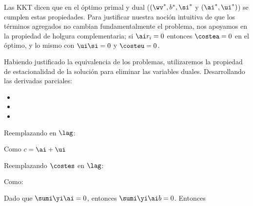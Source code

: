 Las KKT dicen que en el óptimo primal y dual ($(\wv^*,b^*,\si^*$ y $(\ai^*,\ui^*)$) se cumplen estas propiedades. Para justificar nuestra noción intuitiva de que los términos agregados no cambian fundamentalmente el problema, nos apoyamos en la propiedad de holgura complementaria; si $\ai r_i=0$ entonces $\costea =0$ en el óptimo, y lo mismo con $\ui \si = 0$ y $\costeu =0$.

Habiendo justificado la equivalencia de los problemas, utilizaremos la propiedad de estacionalidad de la solución para eliminar las variables duales. Desarrollando las derivadas parciales:
\begin{itemize}
\item {}
\item {}

\item {} 

\end{itemize}


Reemplazando en $\lag$:

\ma{
\lag = \costew + \costes - \costea - \costeu
}

Como $c = \ai+\ui$


Reemplazando $\costes$ en $\lag$:

\ma{
  \lag 
= \costew + \sumi \ai \si + \costeu  - \costea - \costeu \nonumber \\
= \costew + \sumi \ai \si - \costea
}


Como:

Dado que $\sumi \yi \ai =0$, entonces $\sumi  \yi \ai b =0$. Entonces


\ma{
  \costea
= \sumi(\wv \cdot \xi) \yi \ai + \sumi \si \ai - \sumi \ai
}

